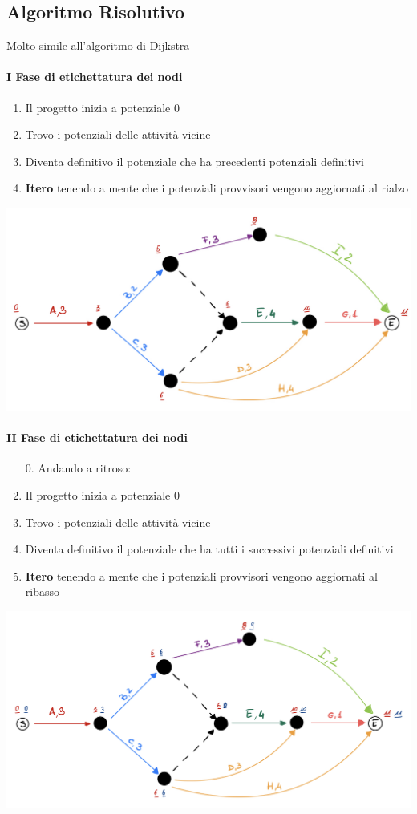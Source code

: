 \documentclass[12pt,a4paper]{article}
\begin{document}
\subsection{Algoritmo Risolutivo}
Molto simile all'algoritmo di Dijkstra
\paragraph{I Fase di etichettatura dei nodi}
\begin{enumerate}
\item Il progetto inizia a potenziale 0
\item Trovo i potenziali delle attività vicine
\item Diventa definitivo il potenziale che ha precedenti potenziali definitivi
\item \textbf{Itero} tenendo a mente che i potenziali provvisori vengono aggiornati al rialzo
\end{enumerate}
\begin{center}
\includegraphics[width=0.4\columnwidth]{img/cpm_fase1.jpg}
\end{center}

\paragraph{II Fase di etichettatura dei nodi}
\begin{enumerate}
\item[0.] Andando a ritroso:
\item Il progetto inizia a potenziale 0
\item Trovo i potenziali delle attività vicine
\item Diventa definitivo il potenziale che ha tutti i successivi potenziali definitivi
\item \textbf{Itero} tenendo a mente che i potenziali provvisori vengono aggiornati al ribasso
\end{enumerate}
\begin{center}
\includegraphics[width=0.4\columnwidth]{img/cpm_fase2.jpg}
\end{center}
\end{document}
